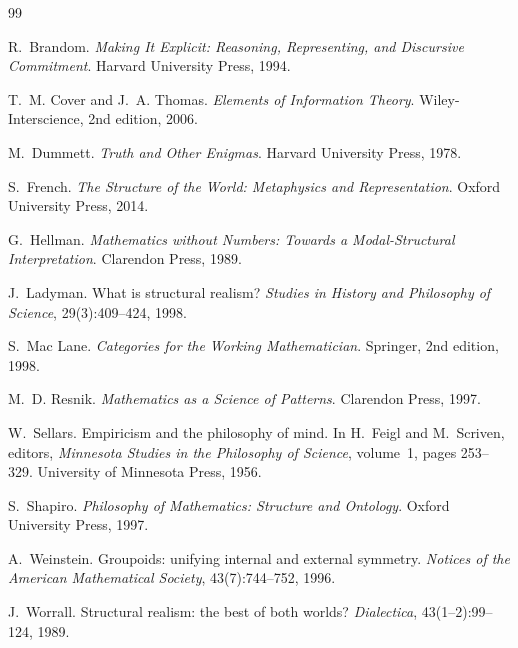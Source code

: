 \documentclass[11pt,a4paper]{article}
\theoremstyle{definition}
\theoremstyle{remark}
\begin{document}
\begin{thebibliography}{99}

R.~Brandom.
\newblock \emph{Making It Explicit: Reasoning, Representing, and
Discursive Commitment}.
\newblock Harvard University Press, 1994.

T.~M. Cover and J.~A. Thomas.
\newblock \emph{Elements of Information Theory}.
\newblock Wiley-Interscience, 2nd edition, 2006.

M.~Dummett.
\newblock \emph{Truth and Other Enigmas}.
\newblock Harvard University Press, 1978.

S.~French.
\newblock \emph{The Structure of the World: Metaphysics and
Representation}.
\newblock Oxford University Press, 2014.

G.~Hellman.
\newblock \emph{Mathematics without Numbers: Towards a Modal-Structural
Interpretation}.
\newblock Clarendon Press, 1989.

J.~Ladyman.
\newblock What is structural realism?
\newblock \emph{Studies in History and Philosophy of Science},
29(3):409--424, 1998.

S.~Mac Lane.
\newblock \emph{Categories for the Working Mathematician}.
\newblock Springer, 2nd edition, 1998.

M.~D. Resnik.
\newblock \emph{Mathematics as a Science of Patterns}.
\newblock Clarendon Press, 1997.

W.~Sellars.
\newblock Empiricism and the philosophy of mind.
\newblock In H.~Feigl and M.~Scriven, editors, \emph{Minnesota Studies
in the Philosophy of Science}, volume~1, pages 253--329. University of
Minnesota Press, 1956.

S.~Shapiro.
\newblock \emph{Philosophy of Mathematics: Structure and Ontology}.
\newblock Oxford University Press, 1997.

A.~Weinstein.
\newblock Groupoids: unifying internal and external symmetry.
\newblock \emph{Notices of the American Mathematical Society},
43(7):744--752, 1996.

J.~Worrall.
\newblock Structural realism: the best of both worlds?
\newblock \emph{Dialectica}, 43(1--2):99--124, 1989.

\end{thebibliography}
\end{document}
